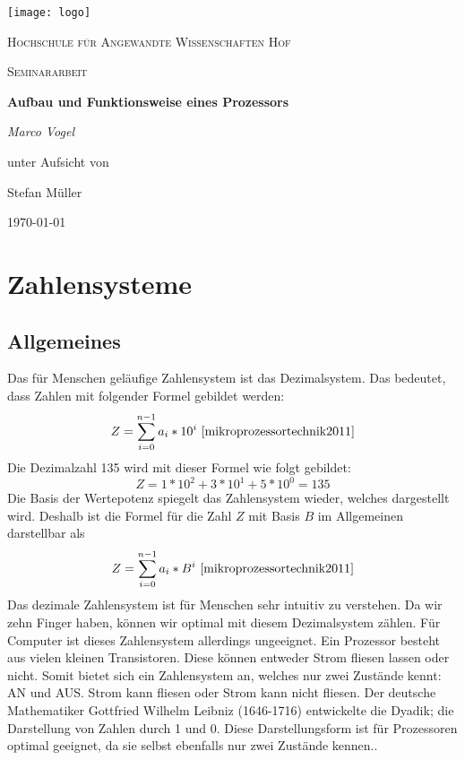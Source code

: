 \documentclass[12pt]{article}
\begin{document}
\begin{titlepage}
	\centering
	\texttt{[image: logo]}\par\vspace{1cm}
	{\scshape\LARGE Hochschule für Angewandte Wissenschaften Hof \par}
	\vspace{1cm}
	{\scshape\Large Seminararbeit\par}
	\vspace{1.5cm}
	{\huge\bfseries Aufbau und Funktionsweise eines Prozessors\par}
	\vspace{2cm}
	{\Large\itshape Marco Vogel\par}
	\vfill
	unter Aufsicht von\par
	Stefan Müller
	\vfill
	{\large\today\par}
\end{titlepage}
\newpage

\pagestyle{empty} 
\tableofcontents
\newpage
\pagestyle{fancy}
\fancyhf{}
\fancyhead[L]{\rightmark}
\fancyhead[R]{\thepage}
\renewcommand{\headrulewidth}{1pt}
\setlength{\footnotemargin}{0pt}

\setcounter{page}{1}


\section{Zahlensysteme}

\subsection{Allgemeines}
Das für Menschen geläufige Zahlensystem ist das Dezimalsystem. Das bedeutet, dass Zahlen mit folgender Formel gebildet werden:
$$Z=\sum\limits_{i=0}^{n-1} a_i * 10^i \ \cite{mikroprozessortechnik2011}$$
Die Dezimalzahl 135 wird mit dieser Formel wie folgt gebildet:$$Z=1*10^2+3*10^1+5*10^0 = 135$$
Die Basis der Wertepotenz spiegelt das Zahlensystem wieder, welches dargestellt wird. Deshalb ist die Formel für die Zahl $Z$ mit Basis $B$ im Allgemeinen darstellbar als
$$Z=\sum\limits_{i=0}^{n-1} a_i * B^i \ \cite{mikroprozessortechnik2011}$$ 
Das dezimale Zahlensystem ist für Menschen sehr intuitiv zu verstehen. Da wir zehn Finger haben, können wir optimal mit diesem Dezimalsystem zählen. Für Computer ist dieses Zahlensystem allerdings ungeeignet. Ein Prozessor besteht aus vielen kleinen Transistoren. Diese können entweder Strom fliesen lassen oder nicht. Somit bietet sich ein Zahlensystem an, welches nur zwei Zustände kennt: AN und AUS. Strom kann fliesen oder Strom kann nicht fliesen. Der deutsche Mathematiker Gottfried Wilhelm Leibniz (1646-1716) entwickelte die Dyadik; die Darstellung von Zahlen durch 1 und 0. Diese Darstellungsform ist für Prozessoren optimal geeignet, da sie selbst ebenfalls nur zwei Zustände kennen.\cite{mikroprozessortechnik2011}.
\end{document}

